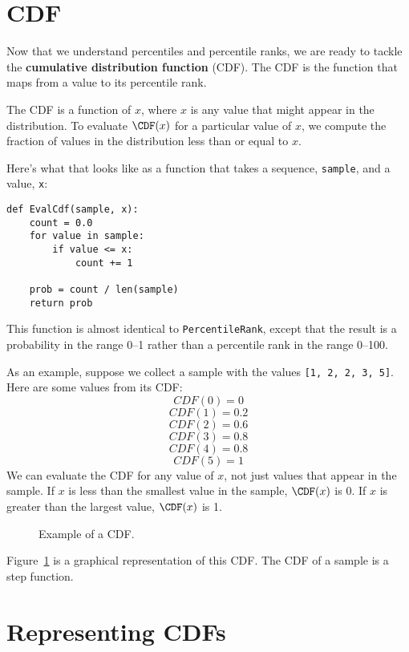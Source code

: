 \section{CDF}


Now that we understand percentiles and percentile ranks,
we are ready to tackle the {\bf cumulative distribution function}
(CDF).  The CDF is the function that maps from a value to its
percentile rank.

The CDF is a function of $x$, where $x$ is any value that might appear
in the distribution.  To evaluate $\CDF(x)$ for a particular value of
$x$, we compute the fraction of values in the distribution less
than or equal to $x$.

Here's what that looks like as a function that takes a sequence,
{\tt sample}, and a value, {\tt x}:
%
\begin{verbatim}
def EvalCdf(sample, x):
    count = 0.0
    for value in sample:
        if value <= x:
            count += 1

    prob = count / len(sample)
    return prob
\end{verbatim}

This function is almost identical to {\tt PercentileRank}, except that
the result is a probability in the range 0--1 rather than a
percentile rank in the range 0--100.

As an example, suppose we collect a sample with the values 
{\tt [1, 2, 2, 3, 5]}.  Here are some values from its CDF:
%
\[ CDF(0) = 0 \]
%
\[ CDF(1) = 0.2\]
%
\[ CDF(2) = 0.6\]
%
\[ CDF(3) = 0.8\]
%
\[ CDF(4) = 0.8\]
%
\[ CDF(5) = 1\]
%
We can evaluate the CDF for any value of $x$, not just
values that appear in the sample.
If $x$ is less than the smallest value in the sample, $\CDF(x)$ is 0.
If $x$ is greater than the largest value, $\CDF(x)$ is 1.

\begin{figure}
\caption{Example of a CDF.}
\label{example_cdf}
\end{figure}

Figure~\ref{example_cdf} is a graphical representation of this CDF.
The CDF of a sample is a step function.


\section{Representing CDFs}

